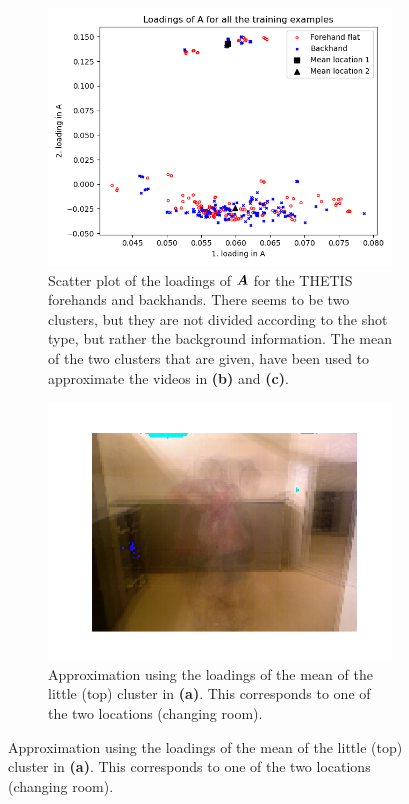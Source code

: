\begin{figure}
    \centering
    \begin{subfigure}{\linewidth}
        \centering
        \includegraphics[width=0.64\linewidth]{Pics/06_results/scatter_loadings_THETIS.png}
        \captionsetup{width=.95\linewidth}
        \caption{Scatter plot of the loadings of $\boldsymbol{A}$ for the THETIS forehands and backhands. There seems to be two clusters, but they are not divided according to the shot type, but rather the background information. The mean of the two clusters that are given, have been used to approximate the videos in \textbf{(b)} and \textbf{(c)}.}
    \end{subfigure}
    \begin{subfigure}{.4\linewidth}
        \centering
        \captionsetup{width=.95\linewidth}
        \includegraphics[width=\linewidth]{Pics/06_results/loc1.png}
        \caption{Approximation using the loadings of the mean of the little (top) cluster in \textbf{(a)}. This corresponds to one of the two locations (changing room).}

\end{subfigure}
\end{figure}
